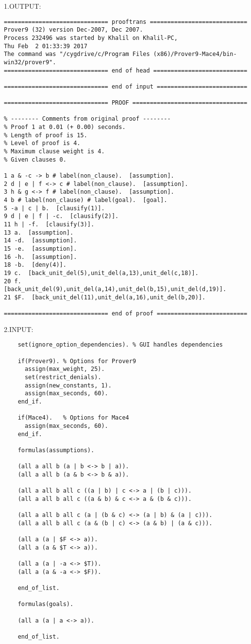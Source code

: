 \documentclass[fullpage]{article}
\begin{document}
1.OUTPUT:

 {\footnotesize \begin{verbatim}
============================== prooftrans ============================
Prover9 (32) version Dec-2007, Dec 2007.
Process 232496 was started by Khalil on Khalil-PC,
Thu Feb  2 01:33:39 2017
The command was "/cygdrive/c/Program Files (x86)/Prover9-Mace4/bin-win32/prover9".
============================== end of head ===========================

============================== end of input ==========================

============================== PROOF =================================

% -------- Comments from original proof --------
% Proof 1 at 0.01 (+ 0.00) seconds.
% Length of proof is 15.
% Level of proof is 4.
% Maximum clause weight is 4.
% Given clauses 0.

1 a & -c -> b # label(non_clause).  [assumption].
2 d | e | f <-> c # label(non_clause).  [assumption].
3 h & g <-> f # label(non_clause).  [assumption].
4 b # label(non_clause) # label(goal).  [goal].
5 -a | c | b.  [clausify(1)].
9 d | e | f | -c.  [clausify(2)].
11 h | -f.  [clausify(3)].
13 a.  [assumption].
14 -d.  [assumption].
15 -e.  [assumption].
16 -h.  [assumption].
18 -b.  [deny(4)].
19 c.  [back_unit_del(5),unit_del(a,13),unit_del(c,18)].
20 f.  [back_unit_del(9),unit_del(a,14),unit_del(b,15),unit_del(d,19)].
21 $F.  [back_unit_del(11),unit_del(a,16),unit_del(b,20)].

============================== end of proof ==========================

\end{verbatim} }

2.INPUT:

 {\footnotesize \begin{verbatim}
	set(ignore_option_dependencies). % GUI handles dependencies
	
	if(Prover9). % Options for Prover9
	  assign(max_weight, 25).
	  set(restrict_denials).
	  assign(new_constants, 1).
	  assign(max_seconds, 60).
	end_if.
	
	if(Mace4).   % Options for Mace4
	  assign(max_seconds, 60).
	end_if.
	
	formulas(assumptions).
	
	(all a all b (a | b <-> b | a)).
	(all a all b (a & b <-> b & a)).
	
	(all a all b all c ((a | b) | c <-> a | (b | c))).
	(all a all b all c ((a & b) & c <-> a & (b & c))).
	
	(all a all b all c (a | (b & c) <-> (a | b) & (a | c))).
	(all a all b all c (a & (b | c) <-> (a & b) | (a & c))).
	
	(all a (a | $F <-> a)).
	(all a (a & $T <-> a)).
	
	(all a (a | -a <-> $T)).
	(all a (a & -a <-> $F)).
	
	end_of_list.
	
	formulas(goals).
	
	(all a (a | a <-> a)).
	
	end_of_list.
\end{verbatim} }
\end{document}
